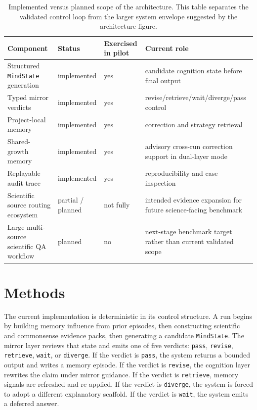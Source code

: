 \documentclass[12pt]{article}
\begin{document}
\begin{table}[H]
\centering
\begin{tabular}{p{4.0cm}p{2.2cm}p{2.2cm}p{5.0cm}}
\toprule
Component & Status & Exercised in pilot & Current role \\
\midrule
Structured \texttt{MindState} generation & implemented & yes & candidate cognition state before final output \\
Typed mirror verdicts & implemented & yes & revise/retrieve/wait/diverge/pass control \\
Project-local memory & implemented & yes & correction and strategy retrieval \\
Shared-growth memory & implemented & yes & advisory cross-run correction support in dual-layer mode \\
Replayable audit trace & implemented & yes & reproducibility and case inspection \\
Scientific source routing ecosystem & partial / planned & not fully & intended evidence expansion for future science-facing benchmark \\
Large multi-source scientific QA workflow & planned & no & next-stage benchmark target rather than current validated scope \\
\bottomrule
\end{tabular}
\caption{Implemented versus planned scope of the architecture. This table separates the validated control loop from the larger system envelope suggested by the architecture figure.}
\label{tab:implemented-scope}
\end{table}

\section{Methods}

The current implementation is deterministic in its control structure. A run begins by building memory influence from prior episodes, then constructing scientific and commonsense evidence packs, then generating a candidate \texttt{MindState}. The mirror layer reviews that state and emits one of five verdicts: \texttt{pass}, \texttt{revise}, \texttt{retrieve}, \texttt{wait}, or \texttt{diverge}. If the verdict is \texttt{pass}, the system returns a bounded output and writes a memory episode. If the verdict is \texttt{revise}, the cognition layer rewrites the claim under mirror guidance. If the verdict is \texttt{retrieve}, memory signals are refreshed and re-applied. If the verdict is \texttt{diverge}, the system is forced to adopt a different explanatory scaffold. If the verdict is \texttt{wait}, the system emits a deferred answer.
\end{document}
